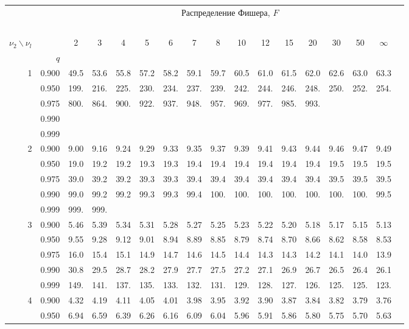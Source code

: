 {\begin{center}
\begin{tabular}{rrr@{\,}r@{\,}r@{\,}r@{\,}r@{\,}r@{\,}r@{\,}r
                   @{\,}r@{\,}r@{\,}r@{\,}r@{\,}r@{\,}r@{\,}r}
&&\multicolumn{14}{c}{Распределение Фишера, $F$}\\
\ \\
$\nu_2\backslash\nu_l$ & & 
\multicolumn{1}{c}{2} &\multicolumn{1}{c}{3} &
\multicolumn{1}{c}{4} &\multicolumn{1}{c}{5} &
\multicolumn{1}{c}{6} &\multicolumn{1}{c}{7} &
\multicolumn{1}{c}{8} &\multicolumn{1}{c}{10}&
\multicolumn{1}{c}{12}&\multicolumn{1}{c}{15}&
\multicolumn{1}{c}{20}&\multicolumn{1}{c}{30}&
\multicolumn{1}{c}{50}&\multicolumn{1}{c}{$\infty$}\\
& $q$ \\
1&0.900&49.5&53.6&55.8&57.2&58.2&59.1&59.7&60.5&61.0&61.5&62.0&62.6&63.0&63.3\\
 &0.950&199.&216.&225.&230.&234.&237.&239.&242.&244.&246.&248.&250.&252.&254.\\
 &0.975&800.&864.&900.&922.&937.&948.&957.&969.&977.&985.&993.\\
 &0.990\\
 &0.999\\
2&0.900&9.00&9.16&9.24&9.29&9.33&9.35&9.37&9.39&9.41&9.43&9.44&9.46&9.47&9.49\\ 
 &0.950&19.0&19.2&19.2&19.3&19.3&19.4&19.4&19.4&19.4&19.4&19.4&19.5&19.5&19.5\\
 &0.975&39.0&39.2&39.2&39.3&39.3&39.4&39.4&39.4&39.4&39.4&39.4&39.5&39.5&39.5\\
 &0.990&99.0&99.2&99.2&99.3&99.3&99.4&100.&100.&100.&100.&100.&100.&100.&99.5\\
 &0.999&999.&999.\\
3&0.900&5.46&5.39&5.34&5.31&5.28&5.27&5.25&5.23&5.22&5.20&5.18&5.17&5.15&5.13\\
 &0.950&9.55&9.28&9.12&9.01&8.94&8.89&8.85&8.79&8.74&8.70&8.66&8.62&8.58&8.53\\
 &0.975&16.0&15.4&15.1&14.9&14.7&14.6&14.5&14.4&14.3&14.3&14.2&14.1&14.0&13.9\\
 &0.990&30.8&29.5&28.7&28.2&27.9&27.7&27.5&27.2&27.1&26.9&26.7&26.5&26.4&26.1\\
 &0.999&149.&141.&137.&135.&133.&132.&131.&129.&128.&127.&126.&125.&125.&123.\\
4&0.900&4.32&4.19&4.11&4.05&4.01&3.98&3.95&3.92&3.90&3.87&3.84&3.82&3.79&3.76\\
 &0.950&6.94&6.59&6.39&6.26&6.16&6.09&6.04&5.96&5.91&5.86&5.80&5.75&5.70&5.63\\

\end{tabular}
\end{center}}
